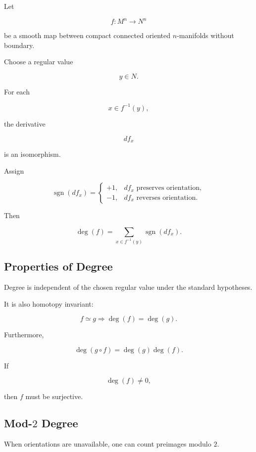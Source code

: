 Let

\[
f:M^n\to N^n
\]

be a smooth map between compact connected oriented \(n\)-manifolds without
boundary.

Choose a regular value

\[
y\in N.
\]

For each

\[
x\in f^{-1}(y),
\]

the derivative

\[
df_x
\]

is an isomorphism.

Assign

\[
\operatorname{sgn}(df_x)
=
\begin{cases}
+1,
&
df_x\text{ preserves orientation},
\\
-1,
&
df_x\text{ reverses orientation}.
\end{cases}
\]

Then

\[
\boxed{
\deg(f)
=
\sum_{x\in f^{-1}(y)}
\operatorname{sgn}(df_x).
}
\]

\subsection{Properties of Degree}
\label{subsec:degree-properties-differential}

Degree is independent of the chosen regular value under the standard
hypotheses.

It is also homotopy invariant:

\[
\boxed{
f\simeq g
\Longrightarrow
\deg(f)=\deg(g).
}
\]

Furthermore,

\[
\boxed{
\deg(g\circ f)
=
\deg(g)\deg(f).
}
\]

If

\[
\deg(f)\neq0,
\]

then \(f\) must be surjective.

\subsection{Mod-\texorpdfstring{\(2\)}{2} Degree}
\label{subsec:mod-two-degree}

When orientations are unavailable, one can count preimages modulo \(2\).

